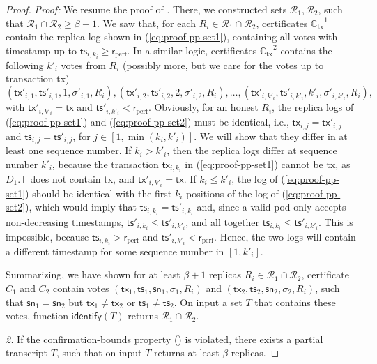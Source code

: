 \documentclass[pdflatex,sn-mathphys-num]{sn-jnl}%
\theoremstyle{thmstyleone}%
\theoremstyle{thmstyletwo}%
\theoremstyle{thmstylethree}%
\newcommand{\CR}{\ensuremath{\mathcal{R}}\xspace}
\newcommand{\operand}[1]{\textsf{#1}}
\newcommand{\tx}{\operand{tx}\xspace}
\newcommand{\round}{\operand{r}\xspace}
\newcommand{\rperf}{\ensuremath{\round_\text{perf}}\xspace}
\newcommand{\rep}{\ensuremath{R}\xspace}
\newcommand{\allreps}{\CR}
\newcommand{\tsp}{\operand{ts}\xspace}
\newcommand{\identify}[1]{\ensuremath{\mathsf{identify}(#1)}\xspace}
\newcommand{\alltxcert}{\ensuremath{\mathbb{C}_\text{tx}}\xspace}
\newcommand{\cert}{\ensuremath{C}\xspace}
\newcommand{\txSet}{\operand{T}\xspace}
\newcommand{\Pod}{\ensuremath{D}\xspace}
\newcommand{\tran}{\ensuremath{T}\xspace}
\let\oldbeta\beta
\renewcommand{\beta}{\ensuremath{\oldbeta}\xspace}
\newcommand{\sig}{\ensuremath{\sigma}\xspace}
\newcommand{\sn}{\operand{sn}\xspace}
\begin{document}
\begin{appendices}
\begin{proof}
	\noindent
	\emph{Proof:}
	We resume the proof of . There, we constructed sets $\allreps_1, \allreps_2$,
	such that $\allreps_1 \cap \allreps_2 \geq \beta + 1$.
	We saw that, for each $\rep_i \in \allreps_1 \cap \allreps_2$, certificates $\alltxcert^1$ contain the replica log shown in (\ref{eq:proof-pp-set1}), containing all votes with timestamp up to $\tsp_{i, k_i} \geq \rperf$.
	In a similar logic, certificates $\alltxcert^2$ contains the following $k'_i$ votes from $\rep_i$ (possibly more, but we care for the votes up to transaction \tx)
	\begin{equation}\label{eq:proof-pp-set2}
		(\tx'_{i,1}, \tsp'_{i,1}, 1, \sigma'_{i,1}, \rep_i), (\tx'_{i,2}, \tsp'_{i,2}, 2, \sigma'_{i,2}, \rep_i), \ldots, (\tx'_{i, k'_i}, \tsp'_{i, k'_i}, k'_i, \sigma'_{i, k'_i}, \rep_i),
	\end{equation}
	with $\tx'_{i, k'_i} = \tx$ and $\tsp'_{i, k'_i} < \rperf$.
	Obviously, for an honest $\rep_i$, the replica logs of (\ref{eq:proof-pp-set1}) and (\ref{eq:proof-pp-set2}) must be identical, i.e., $\tx_{i,j} = \tx'_{i,j}$ and $\tsp_{i,j} = \tsp'_{i,j}$, for $j \in [ 1, \min(k_i, k'_i)]$.
	We will show that they differ in at least one sequence number.
	If $k_i > k'_i$, then the replica logs differ at sequence number $k'_i$, because the transaction $\tx_{i, k_i}$ in (\ref{eq:proof-pp-set1}) cannot be \tx, as $\Pod_1.\txSet$ does not contain \tx, and $\tx'_{i, k'_i} = \tx$.
	If $k_i \leq k'_i$, the log of (\ref{eq:proof-pp-set1}) should be identical with the first $k_i$ positions of the log of (\ref{eq:proof-pp-set2}), which would imply that $\tsp_{i, k_i} = \tsp'_{i, k_i}$ and, since a valid pod only accepts non-decreasing timestamps, $\tsp'_{i, k_i} \leq \tsp'_{i, k'_i}$, and all together $\tsp_{i, k_i} \leq \tsp'_{i, k'_i}$.
	This is impossible, because $\tsp_{i, k_i} > \rperf$ and $\tsp'_{i, k'_i} < \rperf$.
	Hence, the two logs will contain a different timestamp for some sequence number in $[1, k'_i]$.

	Summarizing, we have shown for at least $\beta + 1$ replicas $\rep_i \in \allreps_1 \cap \allreps_2$, certificate $\cert_1$ and $\cert_2$ contain votes $(\tx_1, \tsp_1, \sn_1, \sig_1, \rep_i)$ and $(\tx_2, \tsp_2, \sn_2, \sig_2, \rep_i)$, such that $\sn_1 = \sn_2$ but $\tx_1 \neq \tx_2$ or $\tsp_1 \neq \tsp_2$.
	On input a set $\tran$ that contains these votes, function \identify{\tran} returns $\allreps_1 \cap \allreps_2$.

	\emph{2.}
	If the confirmation-bounds property () is violated, there exists a partial transcript \tran, such that  on input \tran returns at least \beta replicas.


\end{proof}
\end{appendices}
\end{document}
